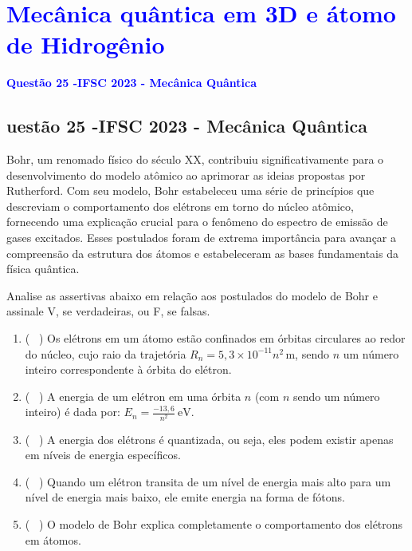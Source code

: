 \section{\large \textcolor{blue}{Mecânica quântica em 3D e átomo de Hidrogênio}}

\begin{flushleft}
\textbf{\textcolor{blue}{\Large Quest\~ao 25 -IFSC 2023 - Mecânica Quântica}}\\
\noindent

\subsection{uest\~ao 25 -IFSC 2023 - Mecânica Quântica}

Bohr, um renomado f\'isico do s\'eculo XX, contribuiu significativamente para o desenvolvimento do modelo at\^omico ao aprimorar as ideias propostas por Rutherford. Com seu modelo, Bohr estabeleceu uma s\'erie de princ\'ipios que descreviam o comportamento dos el\'etrons em torno do n\'ucleo at\^omico, fornecendo uma explica\c{c}\~ao crucial para o fen\^omeno do espectro de emiss\~ao de gases excitados. Esses postulados foram de extrema import\^ancia para avan\c{c}ar a compreens\~ao da estrutura dos \'atomos e estabeleceram as bases fundamentais da f\'isica qu\^antica. 

Analise as assertivas abaixo em rela\c{c}\~ao aos postulados do modelo de Bohr e assinale V, se verdadeiras, ou F, se falsas.

\begin{enumerate}
    \item ( \ ) Os el\'etrons em um \'atomo est\~ao confinados em \'orbitas circulares ao redor do n\'ucleo, cujo raio da trajet\'oria $R_n = 5,3 \times 10^{-11} n^2\,\text{m}$, sendo $n$ um n\'umero inteiro correspondente \`a \'orbita do el\'etron.
    \item ( \ ) A energia de um el\'etron em uma \'orbita $n$ (com $n$ sendo um n\'umero inteiro) \'e dada por: $E_n = \frac{-13,6}{n^2} \ \text{eV}$.
    \item ( \ ) A energia dos el\'etrons \'e quantizada, ou seja, eles podem existir apenas em n\'iveis de energia espec\'ificos.
    \item ( \ ) Quando um el\'etron transita de um n\'ivel de energia mais alto para um n\'ivel de energia mais baixo, ele emite energia na forma de f\'otons.
    \item ( \ ) O modelo de Bohr explica completamente o comportamento dos el\'etrons em \'atomos.
\end{enumerate}


\end{flushleft}
